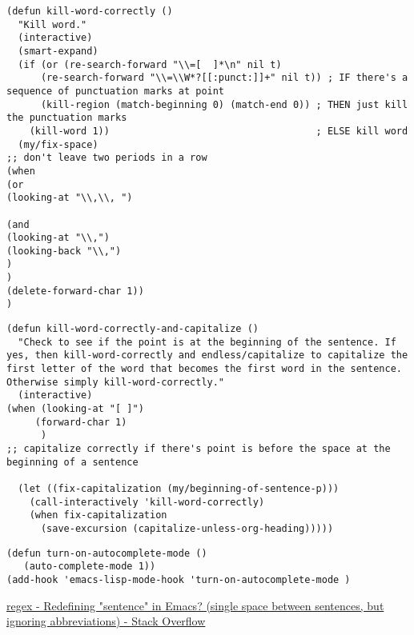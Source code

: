 \documentclass[11pt]{article}
\begin{document}
\label{sec:orgcb354ae}

\begin{verbatim}
(defun kill-word-correctly ()
  "Kill word."
  (interactive)
  (smart-expand)
  (if (or (re-search-forward "\\=[ 	]*\n" nil t)
	  (re-search-forward "\\=\\W*?[[:punct:]]+" nil t)) ; IF there's a sequence of punctuation marks at point
      (kill-region (match-beginning 0) (match-end 0)) ; THEN just kill the punctuation marks
    (kill-word 1))                                    ; ELSE kill word
  (my/fix-space)
;; don't leave two periods in a row
(when 
(or
(looking-at "\\,\\, ")

(and 
(looking-at "\\,")
(looking-back "\\,") 
)
)
(delete-forward-char 1))
)

\end{verbatim}

\label{sec:org23a74ad}

\begin{verbatim}
(defun kill-word-correctly-and-capitalize ()
  "Check to see if the point is at the beginning of the sentence. If yes, then kill-word-correctly and endless/capitalize to capitalize the first letter of the word that becomes the first word in the sentence. Otherwise simply kill-word-correctly."
  (interactive)
(when (looking-at "[ ]")
	 (forward-char 1)
	  )
;; capitalize correctly if there's point is before the space at the beginning of a sentence 

  (let ((fix-capitalization (my/beginning-of-sentence-p)))
    (call-interactively 'kill-word-correctly)
    (when fix-capitalization
      (save-excursion (capitalize-unless-org-heading)))))
\end{verbatim}

\label{sec:org2f54494}
\begin{verbatim}
(defun turn-on-autocomplete-mode ()
   (auto-complete-mode 1))
(add-hook 'emacs-lisp-mode-hook 'turn-on-autocomplete-mode )
\end{verbatim}

\label{sec:orge8e3a11}
\href{http://stackoverflow.com/questions/4754547/redefining-sentence-in-emacs-single-space-between-sentences-but-ignoring-ab}{regex - Redefining "sentence" in Emacs? (single space between sentences, but ignoring abbreviations) - Stack Overflow}
\end{document}

